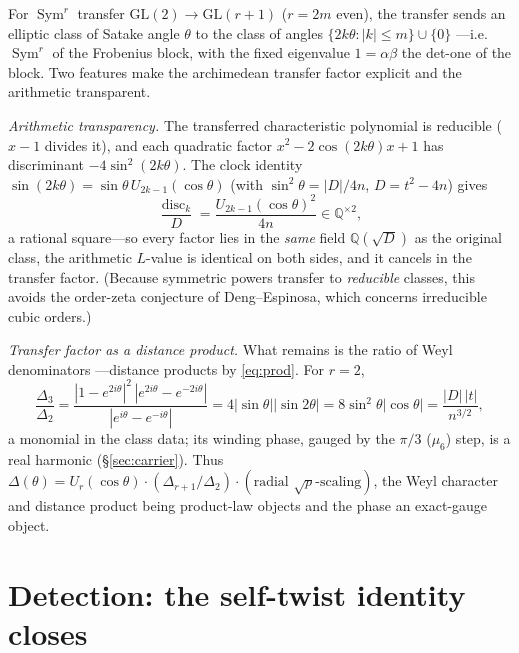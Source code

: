 \documentclass[11pt]{article}
\theoremstyle{definition}
\newcommand{\Sym}{\operatorname{Sym}}
\begin{document}
For $\Sym^r$ transfer $\mathrm{GL}(2)\to\mathrm{GL}(r+1)$ ($r=2m$ even), the transfer sends an
elliptic class of Satake angle $\theta$ to the class of angles $\{2k\theta:|k|\le m\}\cup\{0\}$
---i.e. $\Sym^r$ of the Frobenius block, with the fixed eigenvalue $1=\alpha\beta$ the det-one of
the block. Two features make the archimedean transfer factor explicit and the arithmetic transparent.

\emph{Arithmetic transparency.} The transferred characteristic polynomial is reducible ($x-1$
divides it), and each quadratic factor $x^2-2\cos(2k\theta)x+1$ has discriminant $-4\sin^2(2k\theta)$.
The clock identity $\sin(2k\theta)=\sin\theta\,U_{2k-1}(\cos\theta)$ (with $\sin^2\theta=|D|/4n$,
$D=t^2-4n$) gives
\[
  \frac{\operatorname{disc}_k}{D}=\frac{U_{2k-1}(\cos\theta)^2}{4n}\in\mathbb Q^{\times2},
\]
a rational square---so every factor lies in the \emph{same} field $\mathbb Q(\sqrt D)$ as the
original class, the arithmetic $L$-value is identical on both sides, and it cancels in the transfer
factor. (Because symmetric powers transfer to \emph{reducible} classes, this avoids the order-zeta
conjecture of Deng--Espinosa, which concerns irreducible cubic orders.)

\emph{Transfer factor as a distance product.} What remains is the ratio of Weyl denominators
---distance products by \eqref{eq:prod}. For $r=2$,
\[
  \frac{\Delta_3}{\Delta_2}
  =\frac{|1-e^{2i\theta}|^2\,|e^{2i\theta}-e^{-2i\theta}|}{|e^{i\theta}-e^{-i\theta}|}
  =4|\sin\theta||\sin2\theta|=8\sin^2\theta|\cos\theta|=\frac{|D|\,|t|}{n^{3/2}},
\]
a monomial in the class data; its winding phase, gauged by the $\pi/3$ ($\mu_6$) step, is a real
harmonic (\S\ref{sec:carrier}). Thus $\Delta(\theta)=U_r(\cos\theta)\cdot(\Delta_{r+1}/\Delta_2)
\cdot(\text{radial }\sqrt p\text{-scaling})$, the Weyl character and distance product being product-law
objects and the phase an exact-gauge object.

\section{Detection: the self-twist identity closes}\label{sec:detect}
\end{document}
